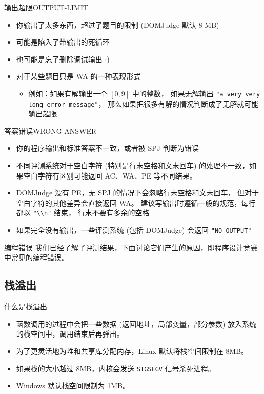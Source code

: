 \documentclass[10pt,mathserif]{beamer}
\begin{document}
\begin{frame}{输出超限}{OUTPUT-LIMIT}
	\begin{itemize}
		\item 你输出了太多东西，超过了题目的限制 (DOMJudge 默认 $8$ MB)
		\item 可能是陷入了带输出的死循环
		\item 也可能是忘了删除调试输出 :)
		\item 对于某些题目只是 WA 的一种表现形式
			\begin{itemize}
				\item 例如：如果有解输出一个 $[0,9]$ 中的整数，
					如果无解输出
					\lstinline!"a very very long error message"!，
					那么如果把很多有解的情况判断成了无解就可能输出超限
			\end{itemize}
	\end{itemize}
\end{frame}

\begin{frame}{答案错误}{WRONG-ANSWER}
	\begin{itemize}
		\item 你的程序输出和标准答案不一致，或者被 SPJ 判断为错误
		\item 不同评测系统对于空白字符 (特别是行末空格和文末回车)
			的处理不一致，如果空白字符有区别可能返回 AC、WA、PE 等不同结果。
		\item DOMJudge 没有 PE，无 SPJ 的情况下会忽略行末空格和文末回车，
			但对于空白字符的其他差异会直接返回 WA。
			建议写输出时遵循一般的规范，每行都以 \lstinline!"\\n"! 结束，
			行末不要有多余的空格
		\item 如果完全没有输出，一些评测系统 (包括 DOMJudge) 会返回
			\lstinline{"NO-OUTPUT"}
	\end{itemize}
\end{frame}

\begin{frame}{编程错误}
	我们已经了解了评测结果，下面讨论它们产生的原因，即程序设计竞赛中常见的编程错误。
\end{frame}

\subsection{栈溢出}

\begin{frame}{什么是栈溢出}
	\begin{itemize}
		\item 函数调用的过程中会把一些数据 (返回地址，局部变量，部分参数)
			放入系统的栈空间中，调用结束后再弹出。
		\item 为了更灵活地为堆和共享库分配内存，Linux 默认将栈空间限制在 8MB。
		\item 如果栈的大小越过 8MB，内核会发送 \lstinline!SIGSEGV!
			信号杀死进程。
		\item Windows 默认栈空间限制为 1MB。
	\end{itemize}
\end{frame}
\end{document}
